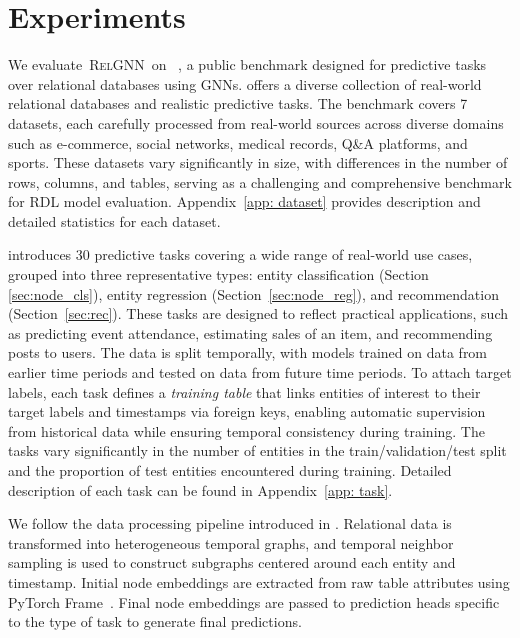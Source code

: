 \documentclass{article}
\newcommand{\method}{\textsc{RelGNN}}
\theoremstyle{plain}
\theoremstyle{definition}
\theoremstyle{remark}
\begin{document}
\section{Experiments}
\label{sec: exp}
 We evaluate~\method~on \relbench~\citep{robinson2024relbench}, a public benchmark  designed for predictive tasks over relational databases using GNNs. 
\relbench offers a diverse collection of real-world relational databases and realistic predictive tasks. The benchmark covers 7 datasets, each carefully processed from real-world sources across diverse domains such as e-commerce, social networks, medical records, Q\&A platforms, and sports. These datasets vary significantly in size, with differences in the number of rows, columns, and tables, serving as a challenging and comprehensive benchmark for RDL model evaluation.  Appendix~\ref{app: dataset} provides description and detailed statistics for each dataset.

 \relbench  introduces 30 predictive tasks covering a wide range of real-world use cases, grouped into three representative types: entity classification (Section \ref{sec:node_cls}), entity regression  (Section~\ref{sec:node_reg}), and recommendation  (Section~\ref{sec:rec}). 
These tasks are designed to reflect practical applications, such as predicting event attendance, estimating sales of an item, and recommending posts to users. The data is split temporally, with models trained on data from earlier time periods and tested on data from future time periods. To attach target labels, each task defines a \emph{training table} that links entities of interest to their target labels and timestamps via foreign keys, enabling automatic supervision from historical data while ensuring temporal consistency during training. The tasks vary significantly in the number of entities in the train/validation/test split and the proportion of test entities encountered during training. Detailed description of each task can be found in Appendix~\ref{app: task}.

 We follow the data processing pipeline introduced in \citet{robinson2024relbench}. Relational data is transformed into heterogeneous temporal graphs, and temporal neighbor sampling is used to construct subgraphs centered around each entity and timestamp. Initial node embeddings are extracted from raw table attributes using PyTorch Frame~\citep{hu2024pytorch}. Final node embeddings are passed to prediction heads specific to the type of task to generate final predictions.
\end{document}
